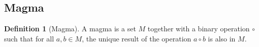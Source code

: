 \documentclass[12pt, titlepage]{amsart}
\theoremstyle{definition}
\newtheorem{definition}{Definition}[subsection]
\begin{document}
	
	\subsection{Magma}
	\begin{definition}[Magma]\label{definition:magma}
		A magma is a set $M$ together with a binary operation $\circ$ such that for all $a,b \in M$, the unique result of the operation $a \circ b$ is also in $M$.
	\end{definition}
	
\end{document}
